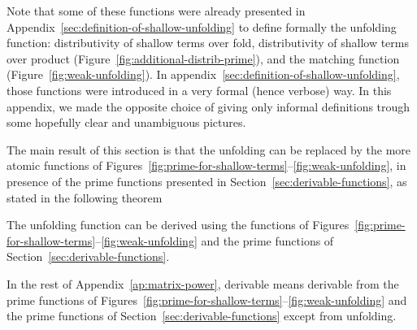 Note that some of these functions were already presented in Appendix~\ref{sec:definition-of-shallow-unfolding} to define formally the unfolding function: distributivity of shallow terms over fold, distributivity of shallow terms over product (Figure~\ref{fig:additional-distrib-prime}), and the matching function (Figure~\ref{fig:weak-unfolding}). In appendix~\ref{sec:definition-of-shallow-unfolding}, those functions were introduced in a very formal (hence verbose) way. In this appendix, we made the opposite choice  of giving only informal definitions trough some hopefully clear and unambiguous pictures. 



The main result of this section is that the unfolding can be replaced by the more atomic functions of Figures~\ref{fig:prime-for-shallow-terms}--\ref{fig:weak-unfolding}, in  presence of the prime functions presented in Section~\ref{sec:derivable-functions}, as stated in the following theorem
 
\begin{theorem}\label{thm:decompose-unfolding}
The unfolding function can be derived using the functions of Figures~\ref{fig:prime-for-shallow-terms}--\ref{fig:weak-unfolding} and the prime functions of Section~\ref{sec:derivable-functions}.
\end{theorem}

In the rest of Appendix~\ref{ap:matrix-power}, derivable means derivable from the prime functions of Figures~\ref{fig:prime-for-shallow-terms}--\ref{fig:weak-unfolding} and the prime functions of Section~\ref{sec:derivable-functions} except from unfolding.







